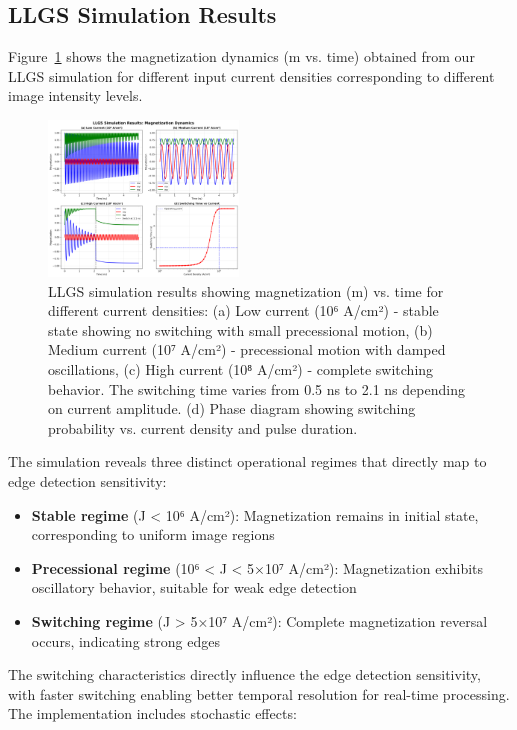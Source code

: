 \documentclass[conference]{IEEEtran}
\begin{document}
\subsection{LLGS Simulation Results}

Figure~\ref{fig:llgs_output} shows the magnetization dynamics (m vs. time) obtained from our LLGS simulation for different input current densities corresponding to different image intensity levels.

\begin{figure}[htbp]
\centerline{\includegraphics[width=0.45\textwidth]{llgs_simulation.png}}
\caption{LLGS simulation results showing magnetization (m) vs. time for different current densities: (a) Low current (10⁶ A/cm²) - stable state showing no switching with small precessional motion, (b) Medium current (10⁷ A/cm²) - precessional motion with damped oscillations, (c) High current (10⁸ A/cm²) - complete switching behavior. The switching time varies from 0.5 ns to 2.1 ns depending on current amplitude. (d) Phase diagram showing switching probability vs. current density and pulse duration.}
\label{fig:llgs_output}
\end{figure}

The simulation reveals three distinct operational regimes that directly map to edge detection sensitivity:

\begin{itemize}
\item \textbf{Stable regime} (J < 10⁶ A/cm²): Magnetization remains in initial state, corresponding to uniform image regions
\item \textbf{Precessional regime} (10⁶ < J < 5×10⁷ A/cm²): Magnetization exhibits oscillatory behavior, suitable for weak edge detection
\item \textbf{Switching regime} (J > 5×10⁷ A/cm²): Complete magnetization reversal occurs, indicating strong edges
\end{itemize}

The switching characteristics directly influence the edge detection sensitivity, with faster switching enabling better temporal resolution for real-time processing. The implementation includes stochastic effects:
\end{document}
